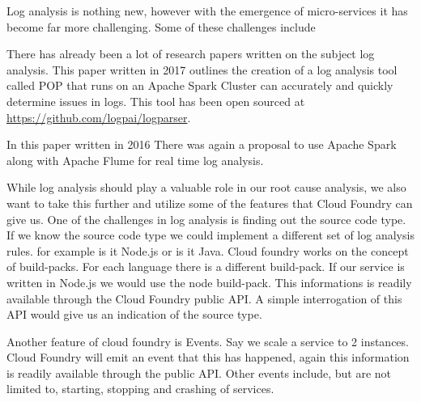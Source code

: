 Log analysis is nothing new, however with the emergence of micro-services it has become far more challenging. Some of these challenges include

There has already been a lot of research papers written on the subject log analysis. This paper written in 2017\cite{8067504} outlines the creation of a log analysis tool called POP that runs on an Apache Spark Cluster can accurately and quickly determine issues in logs. This tool has been open sourced at \href{https://github.com/logpai/logparser}{https://github.com/logpai/logparser}.

In this paper written in 2016\cite{7748933} There was again a proposal to use Apache Spark  along with Apache Flume for real time log analysis. 

While log analysis should play a valuable role in our root cause analysis, we also want to take this further and utilize some of the features that Cloud Foundry can give us. One of the challenges in log analysis is finding out the source code type. If we know the source code type we could implement a different set of log analysis rules. for example is it Node.js or is it Java. Cloud foundry works on the concept of build-packs. For each language there is a different build-pack. If our service is written in Node.js we would use the node build-pack. This informations is readily available through the Cloud Foundry public API. A simple interrogation of this API would give us an indication of the source type.

Another feature of cloud foundry is Events. Say we scale a service to 2 instances. Cloud Foundry will emit an event that this has happened, again this information is readily available through the public API. Other events include, but are not limited to, starting, stopping and crashing of services. 